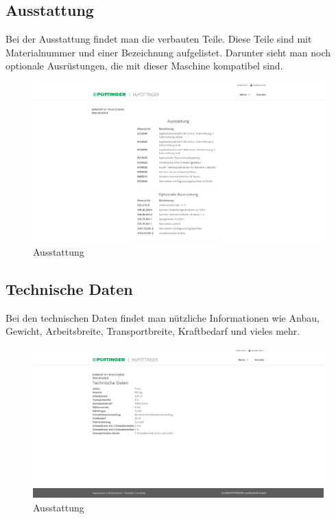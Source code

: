 \subsection{Ausstattung}

Bei der Ausstattung findet man die verbauten Teile. Diese Teile sind mit Materialnummer und einer Bezeichnung aufgelistet. Darunter sieht man noch optionale Ausrüstungen, die mit dieser Maschine kompatibel sind.

\begin{figure}[H]
	\centerline{
		\includegraphics[width=1\textwidth]{./grafiken/erm_detailansicht_ausstattung.PNG}
	}
	\vskip0pt
	\caption{Ausstattung} \label{fig:ausstattung}
\end{figure}

\subsection{Technische Daten}

Bei den technischen Daten findet man nützliche Informationen wie Anbau, Gewicht, Arbeitsbreite, Transportbreite, Kraftbedarf und vieles mehr.

\begin{figure}[H]
	\centerline{
		\includegraphics[width=1\textwidth]{./grafiken/erm_detailansicht_technisch.PNG}
	}
	\vskip0pt
	\caption{Ausstattung} \label{fig:ausstattung}
\end{figure}
